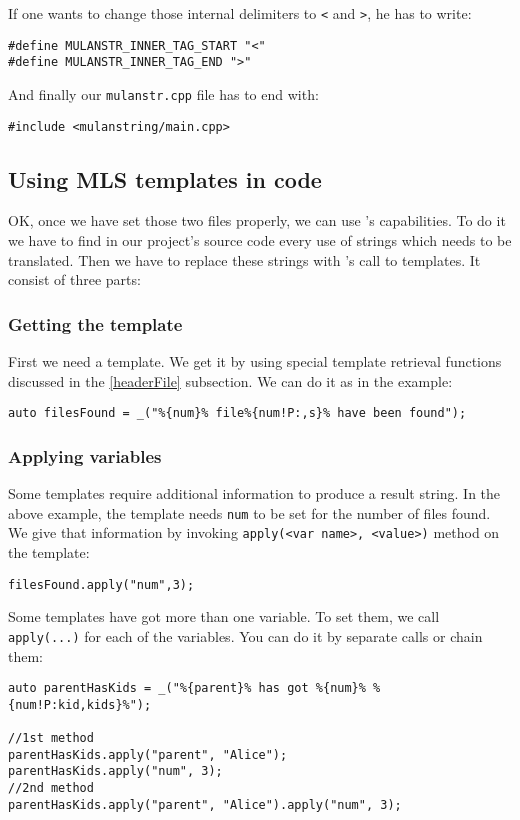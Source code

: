 If one wants to change those internal delimiters to \verb+<+ and \verb+>+, he has to write:
\begin{verbatim}
#define MULANSTR_INNER_TAG_START "<"
#define MULANSTR_INNER_TAG_END ">"
\end{verbatim}

And finally our \texttt{mulanstr.cpp} file has to end with:
\begin{verbatim}
#include <mulanstring/main.cpp>
\end{verbatim}
\subsection{Using MLS templates in code}
OK, once we have set those two files properly, we can use \mulan{}'s capabilities. 
To do it we have to find in our project's source code every use of strings which needs to be translated. 
Then we have to replace these strings with \mulan{}'s call to templates. It consist of three parts:
\subsubsection{Getting the template}
First we need a template. We get it by using special template retrieval functions discussed in the \ref{headerFile} subsection. 
We can do it as in the example:
\begin{verbatim}
auto filesFound = _("%{num}% file%{num!P:,s}% have been found");
\end{verbatim}

\subsubsection{Applying variables}
Some templates require additional information to produce a result string.
In the above example, the template needs \texttt{num} to be set for the number of files found.
We give that information by invoking \verb+apply(<var name>, <value>)+ method on the template:
\begin{verbatim}
filesFound.apply("num",3);
\end{verbatim}
Some templates have got more than one variable. To set them, we call \verb+apply(...)+ for each of the variables.
You can do it by separate calls or chain them:
\begin{verbatim}
auto parentHasKids = _("%{parent}% has got %{num}% %{num!P:kid,kids}%");

//1st method
parentHasKids.apply("parent", "Alice");
parentHasKids.apply("num", 3);
//2nd method
parentHasKids.apply("parent", "Alice").apply("num", 3);
\end{verbatim}

